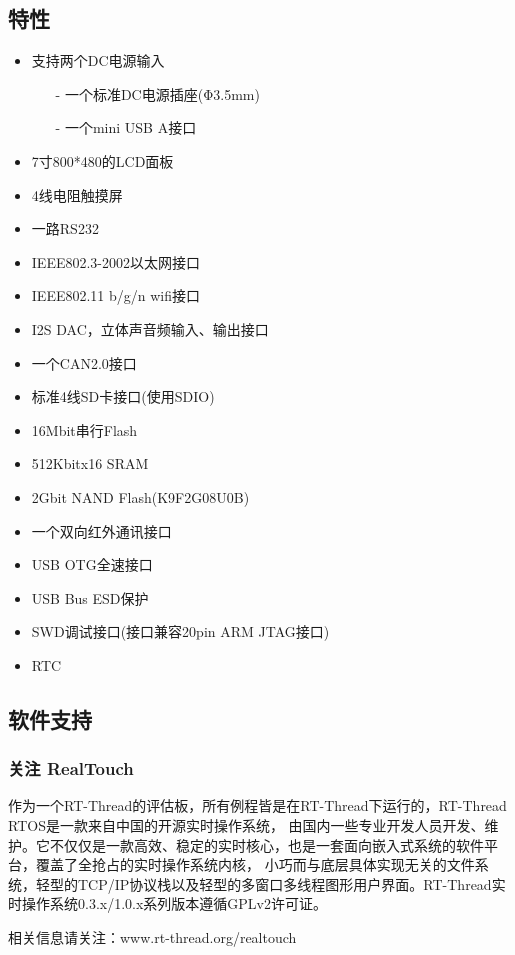 \documentclass[titlepage]{article}
\begin{document}
\subsection{特性}
 \begin{itemize}
 \item 支持两个DC电源输入
    \begin{itemize}
    \item[-] 一个标准DC电源插座(Φ3.5mm)
    \item[-] 一个mini USB A接口
    \end{itemize}
 \item 7寸800*480的LCD面板
 \item 4线电阻触摸屏
 \item 一路RS232
 \item IEEE802.3-2002以太网接口
 \item IEEE802.11 b/g/n wifi接口
 \item I2S DAC，立体声音频输入、输出接口
 \item 一个CAN2.0接口
 \item 标准4线SD卡接口(使用SDIO)
 \item 16Mbit串行Flash
 \item 512Kbitx16 SRAM
 \item 2Gbit NAND Flash(K9F2G08U0B)
 \item 一个双向红外通讯接口
 \item USB OTG全速接口
 \item USB Bus ESD保护
 \item SWD调试接口(接口兼容20pin ARM JTAG接口)
 \item RTC
 \end{itemize}

  \subsection{软件支持}
  \subsubsection{关注 RealTouch}
 作为一个RT-Thread的评估板，所有例程皆是在RT-Thread下运行的，RT-Thread RTOS是一款来自中国的开源实时操作系统，
 由国内一些专业开发人员开发、维护。它不仅仅是一款高效、稳定的实时核心，也是一套面向嵌入式系统的软件平台，覆盖了全抢占的实时操作系统内核，
 小巧而与底层具体实现无关的文件系统，轻型的TCP/IP协议栈以及轻型的多窗口多线程图形用户界面。RT-Thread实时操作系统0.3.x/1.0.x系列版本遵循GPLv2许可证。

 相关信息请关注：www.rt-thread.org/realtouch
\end{document}
